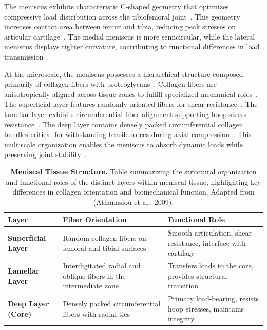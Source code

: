 The meniscus exhibits characteristic C-shaped geometry that optimizes compressive load distribution across the tibiofemoral joint~\cite{makris2011kneemeniscus, athanasiou2009engineeringknee, baek2015meniscustissue}. This geometry increases contact area between femur and tibia, reducing peak stresses on articular cartilage~\cite{makris2011kneemeniscus, abdelgaied2015comparisonbiomechanical, baek2015meniscustissue}. The medial meniscus is more semicircular, while the lateral meniscus displays tighter curvature, contributing to functional differences in load transmission~\cite{makris2011kneemeniscus, athanasiou2009engineeringknee, baek2015meniscustissue}.

At the microscale, the meniscus possesses a hierarchical structure composed primarily of collagen fibers with proteoglycans~\cite{makris2011kneemeniscus, athanasiou2009engineeringknee, baek2015meniscustissue, abdelgaied2015comparisonbiomechanical}. Collagen fibers are anisotropically aligned across tissue zones to fulfill specialized mechanical roles~\cite{makris2011kneemeniscus, baek2015meniscustissue, abdelgaied2015comparisonbiomechanical}. The superficial layer features randomly oriented fibers for shear resistance~\cite{makris2011kneemeniscus, baek2015meniscustissue}. The lamellar layer exhibits circumferential fiber alignment supporting hoop stress resistance~\cite{makris2011kneemeniscus, baek2015meniscustissue}. The deep layer contains densely packed circumferential collagen bundles critical for withstanding tensile forces during axial compression~\cite{makris2011kneemeniscus, baek2015meniscustissue, abdelgaied2015comparisonbiomechanical}. This multiscale organization enables the meniscus to absorb dynamic loads while preserving joint stability~\cite{makris2011kneemeniscus, athanasiou2009engineeringknee, baek2015meniscustissue, abdelgaied2015comparisonbiomechanical}.

\begin{table}[H]
\centering
\setlength{\tabcolsep}{8pt}
\begin{tabular}{|l|p{5cm}|p{5cm}|}
\hline
\rowcolor{gray!20}
\textbf{Layer} & \textbf{Fiber Orientation}& \textbf{Functional Role} \\ \hline
\textbf{Superficial Layer} & Random collagen fibers on femoral and tibial surfaces & Smooth articulation, shear resistance, interface with cartilage \\ \hline
\textbf{Lamellar Layer} & Interdigitated radial and oblique fibers in the intermediate zone & Transfers loads to the core, provides structural transition \\ \hline
\textbf{Deep Layer (Core)} & Densely packed circumferential fibers with radial ties & Primary load-bearing, resists hoop stresses, maintains integrity \\ \hline
\end{tabular}
\caption[Meniscal Tissue Structure]{\textbf{Meniscal Tissue Structure.} Table summarizing the structural organization and functional roles of the distinct layers within meniscal tissue, highlighting key differences in collagen orientation and biomechanical function. Adapted from (Athanasiou et al., 2009).}
\label{tab:meniscal_structure}\end{table}

